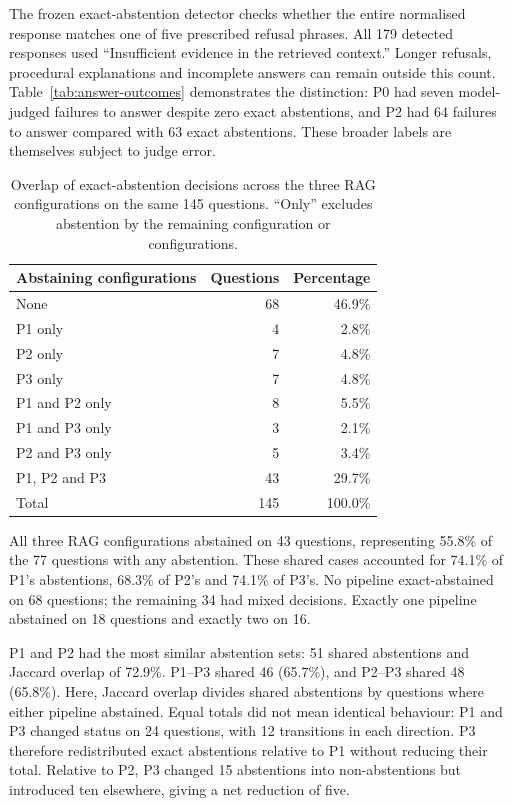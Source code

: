 The frozen exact-abstention detector checks whether the entire normalised
response matches one of five prescribed refusal phrases. All 179 detected
responses used ``Insufficient evidence in the retrieved context.'' Longer
refusals, procedural explanations and incomplete answers can remain outside
this count. Table~\ref{tab:answer-outcomes} demonstrates the distinction:
P0 had seven model-judged failures to answer despite zero exact abstentions,
and P2 had 64 failures to answer compared with 63 exact abstentions.
These broader labels are themselves subject to judge error.

\begin{table}[H]
\centering
\caption{Overlap of exact-abstention decisions across the three RAG
configurations on the same 145 questions. ``Only'' excludes abstention by
the remaining configuration or configurations.}
\label{tab:abstention-overlap}
\begin{tabular}{|l|r|r|}
\hline
\textbf{Abstaining configurations} & \textbf{Questions} & \textbf{Percentage} \\
\hline
None                 & 68  & 46.9\% \\
P1 only              & 4   & 2.8\% \\
P2 only              & 7   & 4.8\% \\
P3 only              & 7   & 4.8\% \\
P1 and P2 only       & 8   & 5.5\% \\
P1 and P3 only       & 3   & 2.1\% \\
P2 and P3 only       & 5   & 3.4\% \\
P1, P2 and P3        & 43  & 29.7\% \\
\hline
Total                & 145 & 100.0\% \\
\hline
\end{tabular}
\end{table}

All three RAG configurations abstained on 43 questions, representing 55.8\%
of the 77 questions with any abstention. These shared cases accounted for
74.1\% of P1's abstentions, 68.3\% of P2's and 74.1\% of P3's. No pipeline
exact-abstained on 68 questions; the remaining 34 had mixed decisions.
Exactly one pipeline abstained on 18 questions and exactly two on 16.

P1 and P2 had the most similar abstention sets: 51 shared abstentions and
Jaccard overlap of 72.9\%. P1--P3 shared 46 (65.7\%), and P2--P3 shared
48 (65.8\%). Here, Jaccard overlap divides shared abstentions by questions
where either pipeline abstained. Equal totals did not mean identical behaviour:
P1 and P3 changed status on 24 questions, with 12 transitions in each
direction. P3 therefore redistributed exact abstentions relative to P1
without reducing their total. Relative to P2, P3 changed 15 abstentions into
non-abstentions but introduced ten elsewhere, giving a net reduction of five.

